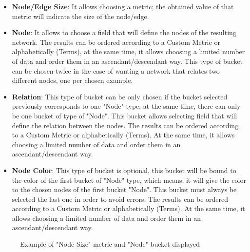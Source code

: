 \documentclass[a4paper, 12pt]{book}
\begin{document}
\begin{itemize}
\item \textbf{Node/Edge Size}: It allows choosing a metric; the obtained value of that metric will indicate the size of the node/edge.
\item \textbf{Node}: It allows to choose a field that will define the nodes of the resulting network. The results can be ordered according to a Custom Metric or alphabetically (Terms), at the same time, it allows choosing a limited number of data and order them in an ascendant/descendant way. This type of bucket can be chosen twice in the case of wanting a network that relates two different nodes, one per chosen example.
\item \textbf{Relation}: This type of bucket can be only chosen if the bucket selected previously corresponds to one "Node" type; at the same time, there can only be one bucket of type of "Node". This bucket allows selecting field that will define the relation between the nodes. The results can be ordered according to a Custom Metric or alphabetically (Terms). At the same time, it allows choosing a limited number of data and order them in an ascendant/descendant way.
\item \textbf{Node Color}: This type of bucket is optional, this bucket will be bound to the color of the first bucket of "Node" type, which means, it will give the color to the chosen nodes of the first bucket "Node". This bucket must always be selected the last one in order to avoid errors. The results can be ordered according to a Custom Metric or alphabetically (Terms). At the same time, it allows choosing a limited number of data and order them in an ascendant/descendant way. 
\end{itemize}

\begin{figure}[H]
 \centering
 \caption{Example of "Node Size" metric and "Node" bucket displayed}
 \label{f:metricbucketdisplayed}
\end{figure}
\end{document}

